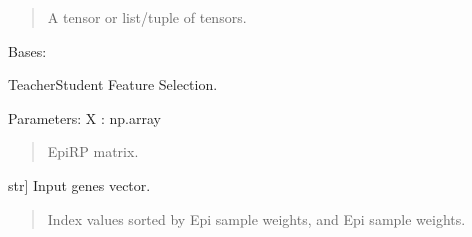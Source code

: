 \documentclass[letterpaper,10pt,english]{sphinxmanual}
\begin{document}
\begin{fulllineitems}
\begin{fulllineitems}
\begin{quote}
\begin{description}
\begin{itemize}
\begin{itemize}
\end{itemize}


\end{itemize}

\sphinxAtStartPar
A tensor or list/tuple of tensors.

\end{description}\end{quote}

\end{fulllineitems}


\end{fulllineitems}


\begin{fulllineitems}
\label{\detokenize{index:TRAPT.DLFS.FeatureSelection}}
\pysigstartsignatures
{}
\pysigstopsignatures
\sphinxAtStartPar
Bases: 

\begin{fulllineitems}
\label{\detokenize{index:TRAPT.DLFS.FeatureSelection.TSFS}}
\pysigstartsignatures
{}
\pysigstopsignatures
\sphinxAtStartPar
Teacher\sphinxhyphen{}Student Feature Selection.

\sphinxAtStartPar
Parameters:
X : np.array
\begin{quote}

\sphinxAtStartPar
Epi\sphinxhyphen{}RP matrix.
\end{quote}
\begin{description}
\sphinxlineitem{T}{[}str{]}
\sphinxAtStartPar
Input genes vector.

\end{description}
\begin{quote}\begin{description}
\sphinxAtStartPar
Index values sorted by Epi sample weights, and Epi sample weights.

\end{description}\end{quote}


\end{fulllineitems}
\end{fulllineitems}
\end{document}
